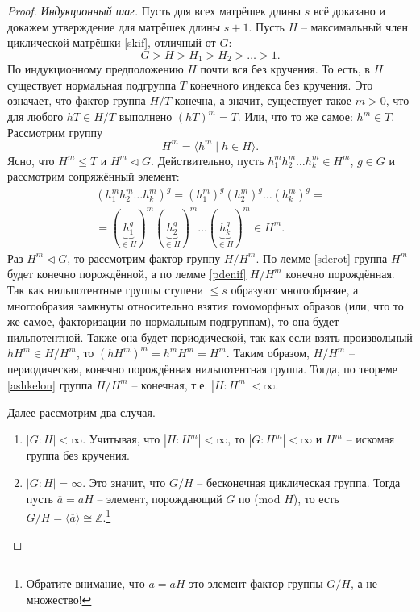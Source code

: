 \documentclass{article}
\begin{document}
\begin{proof}
    \textit{Индукционный шаг.} Пусть для всех матрёшек длины $s$ всё доказано и докажем утверждение для матрёшек длины $s + 1$. Пусть $H$ -- максимальный член циклической матрёшки \eqref{skif}, отличный от $G$:
    \[
        G > H > H_1 > H_2 > \ldots > 1.
    \]
    По индукционному предположению $H$ почти вся без кручения. То есть, в $H$ существует нормальная подгруппа $T$ конечного индекса без кручения. Это означает, что фактор-группа $H/T$ конечна, а значит, существует такое $m > 0$, что для любого $hT \in H/T$ выполнено $(hT)^m = T$. Или, что то же самое: $h^m \in T$.
    Рассмотрим группу $$ H^m = \langle h^m \mid h \in H \rangle. $$ Ясно, что $H^m \leqslant T$ и $H^m \triangleleft G$. Действительно, пусть $h_1^m h_2^m \ldots h_k^m \in H^m$, $g \in G$ и рассмотрим сопряжённый элемент:
    \begin{gather*}
        (h_1^m h_2^m \ldots h_k^m)^g = (h_1^m)^g (h_2^m)^g \ldots (h_k^m)^g = \\
        = (\underbrace{h_1^g}_{\in H})^m (\underbrace{h_2^g}_{\in H})^m \ldots (\underbrace{h_k^g}_{\in H})^m \in H^m.
    \end{gather*}
    Раз $H^m \triangleleft G$, то рассмотрим фактор-группу $H / H^m$. По лемме \ref{sderot} группа $H^m$ будет конечно порождённой, а по лемме \ref{pdenif} $H / H^m$ конечно порождённая. Так как нильпотентные группы ступени $\leqslant s$ образуют многообразие, а многообразия замкнуты относительно взятия гомоморфных образов (или, что то же самое, факторизации по нормальным подгруппам), то она будет нильпотентной. Также она будет периодической, так как если взять произвольный $h H^m \in H / H^m$, то $(h H^m)^m = h^m H^m = H^m$. Таким образом, $H / H^m$ -- периодическая, конечно порождённая нильпотентная группа. Тогда, по теореме \ref{ashkelon} группа $H / H^m$ -- конечная, т.е. $|H : H^m| < \infty$.

    Далее рассмотрим два случая.
    \begin{enumerate}
        \item $|G:H| < \infty$. Учитывая, что $|H : H^m| < \infty$, то $|G : H^m| < \infty$ и $H^m$ -- искомая группа без кручения.

        \item $|G:H| = \infty$. Это значит, что $G / H$ -- бесконечная циклическая группа. Тогда пусть $\overline{a} = aH$ -- элемент, порождающий $G$ по (mod $H$), то есть $G / H = \langle \overline{a} \rangle \cong \mathbb{Z}$.\footnote{Обратите внимание, что $\overline{a} = aH$ это элемент фактор-группы $G/H$, а не множество!}


\end{enumerate}
\end{proof}
\end{document}
